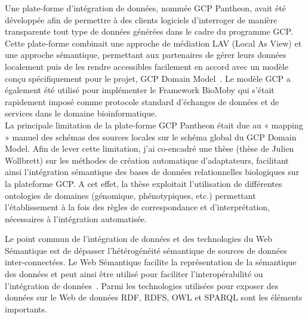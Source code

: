 Une plate-forme d’intégration de données, nommée GCP Pantheon, avait été développée afin de permettre à des clients logiciels d’interroger de manière transparente tout type de données générées dans le cadre du programme GCP. Cette plate-forme combinait une approche de médiation LAV (Local As View) et une approche sémantique, permettant aux partenaires de gérer leurs données localement puis de les rendre accessibles facilement en accord avec un modèle conçu spécifiquement pour le projet, GCP Domain Model~\cite{Bruskiewich2006,Bruskiewich2008}. Le modèle GCP a également été utilisé pour implémenter le Framework BioMoby qui s’était rapidement imposé comme protocole standard d’échanges de données et de services dans le domaine bioinformatique.\\

La principale limitation de la plate-forme GCP Pantheon était due au « mapping » manuel des schémas des sources locales sur le schéma global du GCP Domain Model. Afin de lever cette limitation, j’ai co-encadré une thèse (thèse de Julien Wollbrett) sur les méthodes de création automatique d’adaptateurs, facilitant ainsi l’intégration sémantique des bases de données relationnelles biologiques sur la plateforme GCP. A cet effet, la thèse exploitait l’utilisation de différentes ontologies de domaines (génomique, phénotypiques, etc.) permettant l’établissement à la fois des règles de correspondance et d’interprétation, nécessaires à l’intégration automatisée. 

Le point commun de l’intégration de données et des technologies du Web Sémantique est de dépasser l’hétérogénéité sémantique de sources de données inter-connectées. Le Web Sémantique facilite la représentation de la sémantique des données et peut ainsi être utilisé pour faciliter l’interopérabilité ou l’intégration de données~\cite{antezana2009,Jonquet2010}. Parmi les technologies utilisées pour exposer des données sur le Web de données RDF, RDFS, OWL et SPARQL sont les éléments importants.\\

